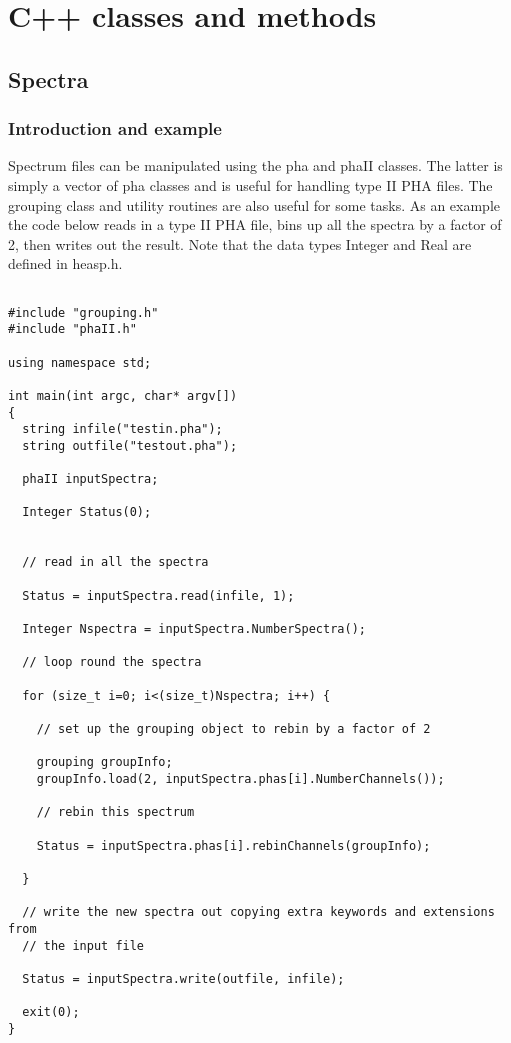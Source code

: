 \documentclass[11pt]{book}
\begin{document}


\chapter{C++ classes and methods}

\section{Spectra}

\subsection{Introduction and example}

Spectrum files can be manipulated using the pha and phaII classes. The
latter is simply a vector of pha classes and is useful for handling
type II PHA files. The grouping class and utility routines are also
useful for some tasks. As an example the code below reads in a type II
PHA file, bins up all the spectra by a factor of 2, then writes out
the result. Note that the data types Integer and Real are defined in heasp.h.

\begin{verbatim}

#include "grouping.h"
#include "phaII.h"

using namespace std;

int main(int argc, char* argv[])
{
  string infile("testin.pha");
  string outfile("testout.pha");

  phaII inputSpectra;

  Integer Status(0);


  // read in all the spectra

  Status = inputSpectra.read(infile, 1);

  Integer Nspectra = inputSpectra.NumberSpectra();

  // loop round the spectra

  for (size_t i=0; i<(size_t)Nspectra; i++) {

    // set up the grouping object to rebin by a factor of 2

    grouping groupInfo;
    groupInfo.load(2, inputSpectra.phas[i].NumberChannels());

    // rebin this spectrum

    Status = inputSpectra.phas[i].rebinChannels(groupInfo);

  }

  // write the new spectra out copying extra keywords and extensions from
  // the input file

  Status = inputSpectra.write(outfile, infile);

  exit(0);
}
\end{verbatim}
\end{document}
